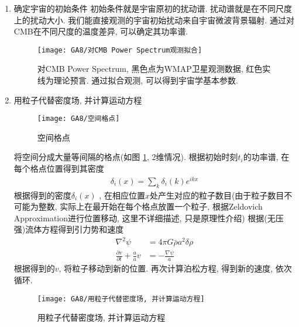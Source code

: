 \begin{enumerate}
    \item 确定宇宙的初始条件
    \subitem 初始条件就是宇宙原初的扰动谱. 扰动谱就是在不同尺度上的扰动大小. 我们能直接观测的宇宙初始扰动来自宇宙微波背景辐射. 通过对CMB在不同尺度的温度差异, 可以确定其功率谱. 
    \begin{figure}[!htb]
        \centering
        \texttt{[image: GA8/对CMB Power Spectrum观测拟合]}
        \caption{\small 对CMB Power Spectrum, 黑色点为WMAP卫星观测数据, 红色实线为理论预言. 通过拟合观测, 可以得到宇宙学基本参数. }
    \end{figure}
    \item 用粒子代替密度场, 并计算运动方程
    \begin{figure}[!htb]
        \centering
        \texttt{[image: GA8/空间格点]}
        \caption{空间格点}
        \label{空间格点}
    \end{figure}
    \subitem 将空间分成大量等间隔的格点(如图 \ref{空间格点}, 2维情况). 根据初始时刻$t_i$的功率谱, 在每个格点位置得到其密度
    \begin{align*}
        \delta_i(x)=\sum_k\delta_i(k)e^{ikx}
    \end{align*}
    根据得到的密度$\delta_i(x)$ , 在相应位置$x$处产生对应的粒子数目(由于粒子数目不可能为整数, 实际上在最开始在每个格点放置一个粒子, 根据Zeldovich Approximation进行位置移动, 这里不详细描述, 只是原理性介绍)
    \subitem 根据(无压强)流体方程得到引力势和速度
    \begin{align*}
        \nabla^2\psi&=4\pi G\bar{\rho} a^2\delta\rho\\
        \frac{\partial v}{\partial t}+\frac{\dot{a}}{a}v&=-\frac{\nabla\psi}{a}
    \end{align*}
    根据得到的$v$, 将粒子移动到新的位置. 再次计算泊松方程, 得到新的速度, 依次循环. 
    \begin{figure}[!htb]
        \centering
        \texttt{[image: GA8/用粒子代替密度场, 并计算运动方程]}
        \caption{用粒子代替密度场, 并计算运动方程}
    \end{figure}
    
\end{enumerate}

